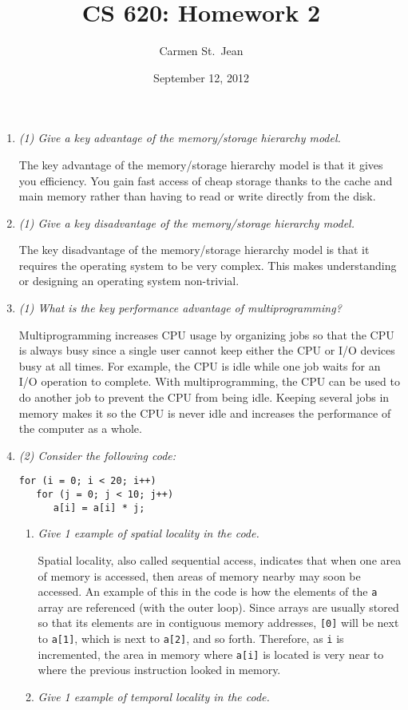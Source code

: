 \documentclass[letterpaper,11pt]{article}
\newcommand{\inlinecode}{\texttt}
\begin{document}
\title{CS 620: Homework 2}
\date{September 12, 2012}
\author{Carmen St.\ Jean}

\maketitle

\begin{enumerate}
  \item \emph{(1) Give a key advantage of the memory/storage hierarchy model.}

  The key advantage of the memory/storage hierarchy model is that it gives you efficiency.  You gain fast access of cheap storage thanks to the cache and main memory rather than having to read or write directly from the disk.
  \item \emph{(1) Give a key disadvantage of the memory/storage hierarchy model.}

  The key disadvantage of the memory/storage hierarchy model is that it requires the operating system to be very complex.  This makes understanding or designing an operating system non-trivial.
  \item \emph{(1) What is the key performance advantage of multiprogramming?}

  Multiprogramming increases CPU usage by organizing jobs so that the CPU is always busy since a single user cannot keep either the CPU or I/O devices busy at all times.  For example, the CPU is idle while one job waits for an I/O operation to complete.  With multiprogramming, the CPU can be used to do another job to prevent the CPU from being idle.  Keeping several jobs in memory makes it so the CPU is never idle and increases the performance of the computer as a whole.
  \item \emph{(2) Consider the following code:}
\begin{verbatim}
for (i = 0; i < 20; i++)
   for (j = 0; j < 10; j++)
      a[i] = a[i] * j;
\end{verbatim}

  \begin{enumerate}
    \item \emph{Give 1 example of spatial locality in the code.}

    Spatial locality, also called sequential access, indicates that when one area of memory is accessed, then areas of memory nearby may soon be accessed.  An example of this in the code is how the elements of the \inlinecode{a} array are referenced (with the outer loop).  Since arrays are usually stored so that its elements are in contiguous memory addresses, \inlinecode{[0]} will be next to \inlinecode{a[1]}, which is next to \inlinecode{a[2]}, and so forth.  Therefore, as \inlinecode{i} is incremented, the area in memory where \inlinecode{a[i]} is located is very near to where the previous instruction looked in memory.
    \item \emph{Give 1 example of temporal locality in the code.}


\end{enumerate}
\end{enumerate}
\end{document}
